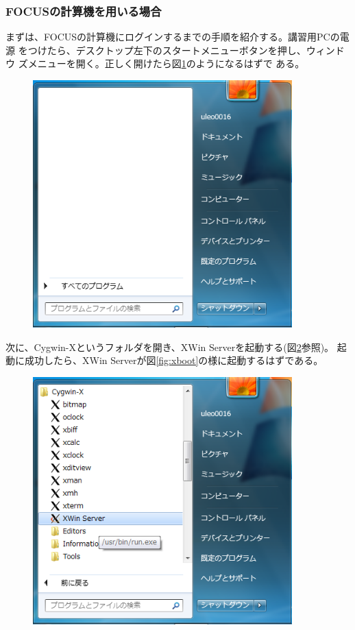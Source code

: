 \documentclass[12pt,a4paper,dvipdfmx]{jarticle}
\begin{document}
\subsubsection{FOCUSの計算機を用いる場合}
まずは、FOCUSの計算機にログインするまでの手順を紹介する。講習用PCの電源
をつけたら、デスクトップ左下のスタートメニューボタンを押し、ウィンドウ
ズメニューを開く。正しく開けたら図\ref{fig:startmenu}のようになるはずで
ある。
\begin{figure}
  \begin{center}
    \includegraphics[clip, width=10.0cm]{fig/startmenu_.png}
  \end{center}
  \caption{}
  \label{fig:startmenu}
\end{figure}

次に、Cygwin-Xというフォルダを開き、XWin Serverを起動する(図\ref{fig:cygwinX2}参照)。
起動に成功したら、XWin Serverが図\ref{fig:xboot}の様に起動するはずである。
\begin{figure}
  \begin{center}
    \includegraphics[clip, width=10.0cm]{fig/cygwin-X2_.png}
  \end{center}
  \caption{}
  \label{fig:cygwinX2}
\end{figure}
\end{document}
